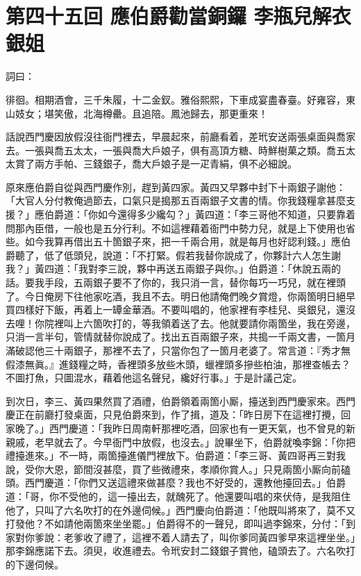 
\chapter*{第四十五回 應伯爵勸當銅鑼 李瓶兒解衣銀姐}


詞曰：

\begin{myquote}
徘徊。相期酒會，三千朱履，十二金釵。雅俗熙熙，下車成宴盡春臺。好雍容，東山妓女；堪笑傲，北海樽罍。且追陪。鳳池歸去，那更重來！

\end{myquote}

話說西門慶因放假沒往衙門裡去，早晨起來，前廳看着，差玳安送兩張桌面與喬家去。一張與喬五太太，一張與喬大戶娘子，俱有高頂方糖、時鮮樹菓之類。喬五太太賞了兩方手帕、三錢銀子，喬大戶娘子是一疋青絹，俱不必細說。

原來應伯爵自從與西門慶作別，趕到黃四家。黃四又早夥中封下十兩銀子謝他：「大官人分付教俺過節去，口氣只是搗那五百兩銀子文書的情。你我錢糧拿甚麼支援？」應伯爵道：「你如今還得多少纔勾？」黃四道：「李三哥他不知道，只要靠着問那內臣借，一般也是五分行利。不如這裡藉着衙門中勢力兒，就是上下使用也省些。如今我算再借出五十箇銀子來，把一千兩合用，就是每月也好認利錢。」應伯爵聽了，低了低頭兒，說道：「不打緊。假若我替你說成了，你夥計六人怎生謝我？」黃四道：「我對李三說，夥中再送五兩銀子與你。」伯爵道：「休說五兩的話。要我手段，五兩銀子要不了你的，我只消一言，替你每巧一巧兒，就在裡頭了。今日俺房下往他家吃酒，我且不去。明日他請俺們晚夕賞燈，你兩箇明日絕早買四樣好下飯，再着上一罈金華酒。不要叫唱的，他家裡有李桂兒、吳銀兒，還沒去哩！你院裡叫上六箇吹打的，等我領着送了去。他就要請你兩箇坐，我在旁邊，只消一言半句，管情就替你說成了。找出五百兩銀子來，共搗一千兩文書，一箇月滿破認他三十兩銀子，那裡不去了，只當你包了一箇月老婆了。常言道：『秀才無假漆無眞。』{}進錢糧之時，香裡頭多放些木頭，蠟裡頭多摻些柏油，那裡查帳去？不圖打魚，只圖混水，藉着他這名聲兒，纔好行事。」于是計議己定。

到次日，李三、黃四果然買了酒禮，伯爵領着兩箇小厮，擡送到西門慶家來。西門慶正在前廳打發桌面，只見伯爵來到，作了揖，道及：「昨日房下在這裡打攪，回家晚了。」西門慶道：「我昨日周南軒那裡吃酒，回家也有一更天氣，也不曾見的新親戚，老早就去了。今早衙門中放假，也沒去。」說畢坐下，伯爵就喚李錦：「你把禮擡進來。」不一時，兩箇擡進儀門裡放下。伯爵道：「李三哥、黃四哥再三對我說，受你大恩，節間沒甚麼，買了些微禮來，孝順你賞人。」只見兩箇小厮向前磕頭。西門慶道：「你們又送這禮來做甚麼？我也不好受的，還教他擡回去。」伯爵道：「哥，你不受他的，這一擡出去，就醜死了。他還要叫唱的來伏侍，是我阻住他了，只叫了六名吹打的在外邊伺候。」西門慶向伯爵道：「他既叫將來了，莫不又打發他？不如請他兩箇來坐坐罷。」伯爵得不的一聲兒，即叫過李錦來，分付：「到家對你爹說：老爹收了禮了，這裡不着人請去了，叫你爹同黃四爹早來這裡坐坐。」那李錦應諾下去。須臾，收進禮去。令玳安封二錢銀子賞他，磕頭去了。六名吹打的下邊伺候。


